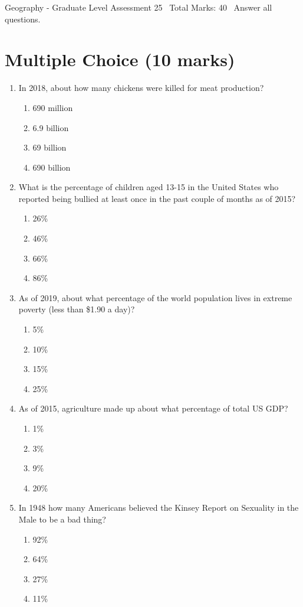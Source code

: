 \documentclass[12pt]{article}
\begin{document}
\begin{center}
Geography - Graduate Level Assessment 25 \
Total Marks: 40 \
Answer all questions.
\end{center}

\section*{Multiple Choice (10 marks)}
\begin{enumerate}[label=\arabic*.]
\item In 2018, about how many chickens were killed for meat production?
\begin{enumerate}[label=(\alph*)]
    \item 690 million
    \item 6.9 billion
    \item 69 billion
    \item 690 billion
\end{enumerate}
\item What is the percentage of children aged 13-15 in the United States who reported being bullied at least once in the past couple of months as of 2015?
\begin{enumerate}[label=(\alph*)]
    \item 26\%
    \item 46\%
    \item 66\%
    \item 86\%
\end{enumerate}
\item As of 2019, about what percentage of the world population lives in extreme poverty (less than \$1.90 a day)?
\begin{enumerate}[label=(\alph*)]
    \item 5\%
    \item 10\%
    \item 15\%
    \item 25\%
\end{enumerate}
\item As of 2015, agriculture made up about what percentage of total US GDP?
\begin{enumerate}[label=(\alph*)]
    \item 1\%
    \item 3\%
    \item 9\%
    \item 20\%
\end{enumerate}
\item In 1948 how many Americans believed the Kinsey Report on Sexuality in the Male to be a bad thing?
\begin{enumerate}[label=(\alph*)]
    \item 92\%
    \item 64\%
    \item 27\%
    \item 11\%
\end{enumerate}
\end{enumerate}
\end{document}
